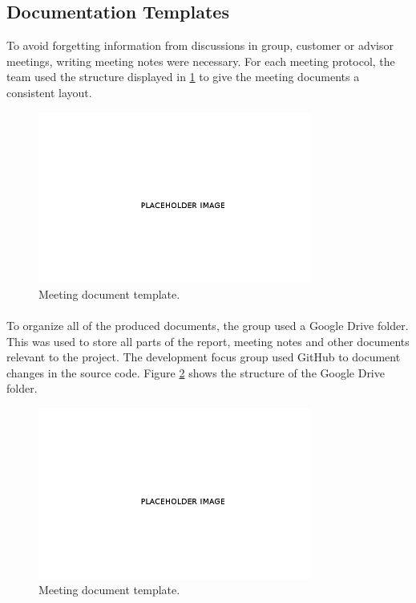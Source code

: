 \subsection{Documentation Templates}
\label{subsec:PlanningQualityDocu}
To avoid forgetting information from discussions in group, customer or advisor meetings, writing meeting notes were necessary. For each meeting protocol, the team used the structure displayed in \ref{fig:PlanningQualityDocuMeeting} to give the meeting documents a consistent layout.

\begin{figure}[ht!]
\centering
\includegraphics[width=90mm]{./img/Placehoder}
\caption{Meeting document template. \label{fig:PlanningQualityDocuMeeting}}
\end{figure}

\paragraph{} To organize all of the produced documents, the group used a Google Drive folder. This was used to store all parts of the report, meeting notes and other documents relevant to the project. The development focus group used GitHub to document changes in the source code. Figure \ref{fig:PlanningQualityDocuDrive} shows the structure of the Google Drive folder.

\begin{figure}[ht!]
\centering
\includegraphics[width=90mm]{./img/Placehoder}
\caption{Meeting document template. \label{fig:PlanningQualityDocuDrive}}
\end{figure}

